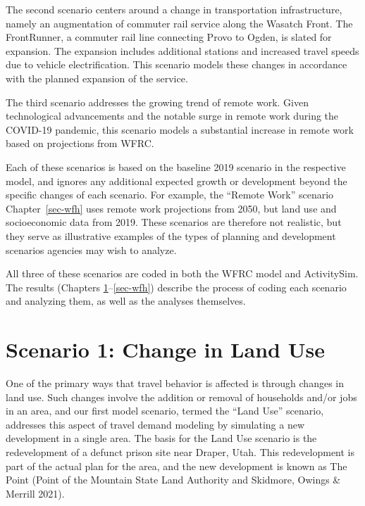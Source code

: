 \documentclass[fancy, twoside, mastersfancy, ms]{byuthesis}
\begin{document}
The second scenario centers around a change in transportation
infrastructure, namely an augmentation of commuter rail service along
the Wasatch Front. The FrontRunner, a commuter rail line connecting
Provo to Ogden, is slated for expansion. The expansion includes
additional stations and increased travel speeds due to vehicle
electrification. This scenario models these changes in accordance with
the planned expansion of the service.

The third scenario addresses the growing trend of remote work. Given
technological advancements and the notable surge in remote work during
the COVID-19 pandemic, this scenario models a substantial increase in
remote work based on projections from WFRC.

Each of these scenarios is based on the baseline 2019 scenario in the
respective model, and ignores any additional expected growth or
development beyond the specific changes of each scenario. For example,
the ``Remote Work'' scenario Chapter~\ref{sec-wfh} uses remote work
projections from 2050, but land use and socioeconomic data from 2019.
These scenarios are therefore not realistic, but they serve as
illustrative examples of the types of planning and development scenarios
agencies may wish to analyze.

All three of these scenarios are coded in both the WFRC model and
ActivitySim. The results (Chapters \ref{sec-landuse}--\ref{sec-wfh})
describe the process of coding each scenario and analyzing them, as well
as the analyses themselves.


\chapter{Scenario 1: Change in Land Use}\label{sec-landuse}

One of the primary ways that travel behavior is affected is through
changes in land use. Such changes involve the addition or removal of
households and/or jobs in an area, and our first model scenario, termed
the ``Land Use'' scenario, addresses this aspect of travel demand
modeling by simulating a new development in a single area. The basis for
the Land Use scenario is the redevelopment of a defunct prison site near
Draper, Utah. This redevelopment is part of the actual plan for the
area, and the new development is known as The Point (Point of the
Mountain State Land Authority and Skidmore, Owings \& Merrill 2021).
\end{document}
